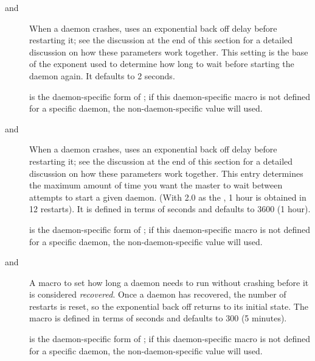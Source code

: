 \begin{description}
\item[ and
      ]
  \label{param:MasterBackoffFactor}
  When a daemon crashes,  uses an exponential back off
  delay before restarting it; see the discussion at the end of this
  section for a detailed discussion on how these parameters work together.
  This setting is the base of the
  exponent used to determine how long to wait before starting the
  daemon again.  It defaults to 2 seconds.

   is the daemon-specific
  form of ; if this daemon-specific
  macro is not defined for a specific daemon, the non-daemon-specific
  value will used.

\item[ and
      ]
  \label{param:MasterBackoffCeiling}
  When a daemon crashes,  uses an exponential back off
  delay before restarting it; see the discussion at the end of this
  section for a detailed discussion on how these parameters work together.
  This entry determines the maximum amount of time you want the master
  to wait between attempts to start a given daemon.
  (With 2.0 as the ,
  1 hour is obtained in 12 restarts).  It is defined in terms of
  seconds and defaults to 3600 (1 hour).

   is the daemon-specific
  form of ; if this daemon-specific
  macro is not defined for a specific daemon, the non-daemon-specific
  value will used.

\item[ and
      ]
  \label{param:MasterRecoverFactor}  A macro to set how long a daemon 
  needs to run without crashing before it is considered \emph{recovered}.
  Once a
  daemon has recovered, the number of restarts is reset, so the
  exponential back off returns to its initial state.  
  The macro is defined in
  terms of seconds and defaults to 300 (5 minutes).

   is the daemon-specific
  form of ; if this daemon-specific
  macro is not defined for a specific daemon, the non-daemon-specific
  value will used.

\end{description}

